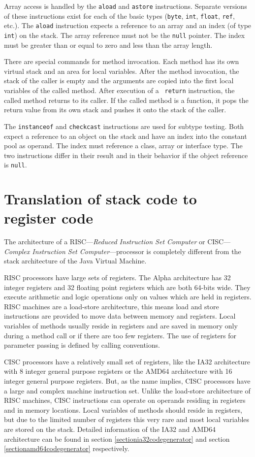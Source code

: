 Array access is handled by the {\tt aload} and {\tt astore} instructions.
Separate versions of these instructions exist for each of the basic types
({\tt byte}, {\tt int}, {\tt float}, {\tt ref}, etc.). The {\tt aload}
instruction expects a reference to an array and an index (of type {\tt
int}) on the stack. The array reference must not be the {\tt null} pointer.
The index must be greater than or equal to zero and less than the array
length.

There are special commands for method invocation. Each method has its own
virtual stack and an area for local variables. After the method invocation,
the stack of the caller is empty and the arguments are copied into the
first local variables of the called method. After execution of a {\tt
return} instruction, the called method returns to its caller. If the called
method is a function, it pops the return value from its own stack and
pushes it onto the stack of the caller.

The {\tt instanceof} and {\tt checkcast} instructions are used for subtype
testing. Both expect a reference to an object on the stack and have an
index into the constant pool as operand. The index must reference a class,
array or interface type. The two instructions differ in their result and in
their behavior if the object reference is {\tt null}.


\section{Translation of stack code to register code}

The architecture of a RISC---\textit{Reduced Instruction Set Computer}
or CISC---\textit{Complex Instruction Set Computer}---processor is
completely different from the stack architecture of the Java Virtual
Machine.

RISC processors have large sets of registers. The Alpha architecture
has 32 integer registers and 32 floating point registers which are
both 64-bits wide. They execute arithmetic and logic operations only
on values which are held in registers. RISC machines are a load-store
architecture, this means load and store instructions are provided to
move data between memory and registers. Local variables of methods
usually reside in registers and are saved in memory only during a
method call or if there are too few registers. The use of registers
for parameter passing is defined by calling conventions.

CISC processors have a relatively small set of registers, like the
IA32 architecture with 8 integer general purpose registers or the
AMD64 architecture with 16 integer general purpose registers. But, as
the name implies, CISC processors have a large and complex machine
instruction set. Unlike the load-store architecture of RISC machines,
CISC instructions can operate on operands residing in registers and in
memory locations. Local variables of methods should reside in
registers, but due to the limited number of registers this very rare
and most local variables are stored on the stack. Detailed information
of the IA32 and AMD64 architecture can be found in section
\ref{sectionia32codegenerator} and section
\ref{sectionamd64codegenerator} respectively.


